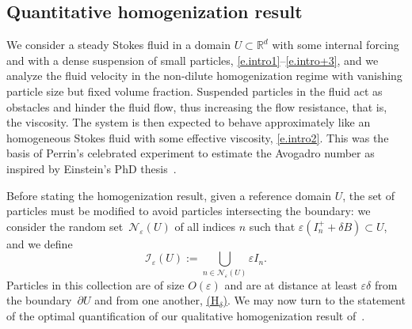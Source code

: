 \documentclass[10pt]{amsart}
\let\mathcal\mathscr
\newcommand{\Hd}{\hyperref[Hd]{\textup{(H$_\delta$)}}\xspace}
\theoremstyle{plain}
\theoremstyle{definition}
\newcommand{\e}{\varepsilon}
\newcommand{\R}{\mathbb R}
\newcommand{\Ic}{\mathcal I}
\newcommand{\Nc}{\mathcal N}
\begin{document}
\subsection{Quantitative homogenization result}\label{sec:homog}
We consider a steady Stokes fluid in a domain $U\subset\R^d$ with some internal forcing and with a dense suspension of small particles, \cf \eqref{e.intro1}--\eqref{e.intro+3}, and we analyze the fluid velocity in the non-dilute homogenization regime with vanishing particle size but fixed volume fraction. Suspended particles in the fluid act as obstacles and hinder the fluid flow, thus increasing the flow resistance, that is, the viscosity. The system is then expected to behave approximately like an homogeneous Stokes fluid with some effective viscosity, \cf \eqref{e.intro2}. This was the basis of Perrin's celebrated experiment to estimate the Avogadro number as inspired by Einstein's PhD thesis~\cite{Einstein-06}.

Before stating the homogenization result, given a reference domain $U$, the set of particles must be modified to avoid particles intersecting the boundary: we consider the random set~$\Nc_\e(U)$ of all indices $n$
such that $\e(I_n^++\delta B)\subset U$, and we define
\[\Ic_\e(U):=\bigcup_{n\in\Nc_\e(U)}\e I_n.\]
Particles in this collection are of size $O(\e)$ and are at distance at least $\e\delta$ from the boundary~$\partial U$ and from one another, \cf \Hd. We may now turn to the statement of the optimal quantification of our
qualitative homogenization result of~\cite{DG-19}.
\end{document}
